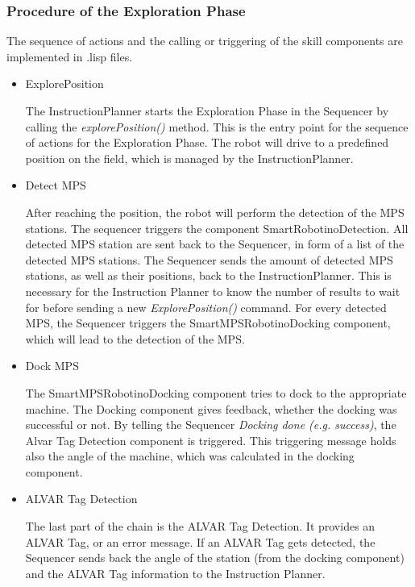 \subsubsection{Procedure of the Exploration Phase}

The sequence of actions and the calling or triggering of the skill components are implemented in .lisp files.

\begin{itemize}

\item ExplorePosition

The InstructionPlanner starts the Exploration Phase in the Sequencer by calling the \textit{explorePosition()} method. This is the entry point for the sequence of actions for the Exploration Phase. The robot will drive to a predefined position on the field, which is managed by the InstructionPlanner.

\item Detect MPS

After reaching the position, the robot will perform the detection of the MPS stations. The sequencer triggers the component SmartRobotinoDetection.
All detected MPS station are sent back to the Sequencer, in form of a list of the detected MPS stations.
The Sequencer sends the amount of detected MPS stations, as well as their positions, back to the InstructionPlanner.
This is necessary for the Instruction Planner to know the number of results to wait for before sending a new \textit{ExplorePosition()} command.
For every detected MPS, the Sequencer triggers the SmartMPSRobotinoDocking component, which will lead to the detection of the MPS.

\item Dock MPS

The SmartMPSRobotinoDocking component tries to dock to the appropriate machine.
The Docking component gives feedback, whether the docking was successful or not. By telling the Sequencer \textit{Docking done (e.g. success)}, the Alvar Tag Detection component is triggered. This triggering message holds also the angle of the machine, which was calculated in the docking component.

\item ALVAR Tag Detection

The last part of the chain is the ALVAR Tag Detection. It provides an ALVAR Tag, or an error message.
If an ALVAR Tag gets detected, the Sequencer sends back the angle of the station (from the docking component) and the ALVAR Tag information to the Instruction Planner.

\end{itemize}


